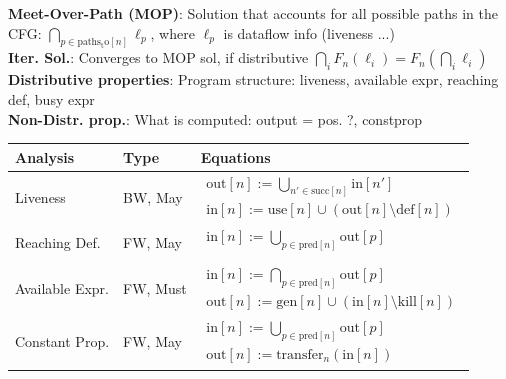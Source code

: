 \textbf{Meet-Over-Path (MOP)}: Solution that accounts for all possible paths in the CFG: $\bigcap_{p \in \operatorname{paths_to}[n]}\ell_p$, where $\ell_p$ is dataflow info (liveness ...)\\
\textbf{Iter. Sol.}: Converges to MOP sol, if distributive $\bigcap_i F_n (\ell_i)= F_n (\bigcap_i \ell_i)$\\
\textbf{Distributive properties}: Program structure: liveness, available expr, reaching def, busy expr\\
\textbf{Non-Distr. prop.}: What is computed: output = pos. ?, constprop\\



\begin{center}
\begin{tabular}{lll}
\hline
\textbf{Analysis} & \textbf{Type} & \textbf{Equations} \\
\hline

Liveness &
BW, May &
{\tiny $
\begin{array}{l}
\text{out}[n] := \bigcup_{n' \in \mathrm{succ}[n]} \text{in}[n'] \\
\text{in}[n] := \text{use}[n] \cup (\text{out}[n] \setminus \text{def}[n])
\end{array}$}
\\[1.5ex]

Reaching Def. &
FW, May &
{\tiny $
\begin{array}{l}
\text{in}[n] := \bigcup_{p \in \mathrm{pred}[n]} \text{out}[p] \\

\end{array}$}
\\[1.5ex]

Available Expr. &
FW, Must &
{\tiny $
\begin{array}{l}
\text{in}[n] := \bigcap_{p \in \mathrm{pred}[n]} \text{out}[p] \\
\text{out}[n] := \text{gen}[n] \cup (\text{in}[n] \setminus \text{kill}[n])
\end{array}$}
\\[1.5ex]

Constant Prop. &
FW, May &
{\tiny $
\begin{array}{l}
\text{in}[n] := \bigcup_{p \in \mathrm{pred}[n]} \text{out}[p] \\
\text{out}[n] := \text{transfer}_n(\text{in}[n])
\end{array}$}
\\[1.5ex]


\end{tabular}
\end{center}
